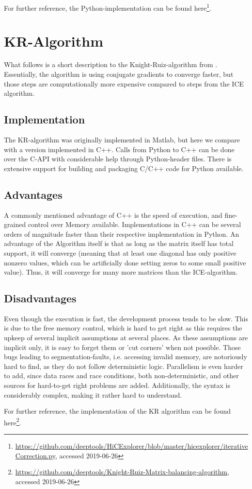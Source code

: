 For further reference, the Python-implementation can be found
here\footnote{\url{https://github.com/deeptools/HiCExplorer/blob/master/hicexplorer/iterativeCorrection.py},
accessed 2019-06-26}.



\section{KR-Algorithm}\label{sec:KR}

What follows is a short description to the Knight-Ruiz-algorithm from
\cite{knight2013fast}. Essentially, the algorithm is using conjugate gradients
to converge faster, but those steps are computationally more expensive
compared to steps from the ICE algorithm.

\subsection{Implementation}

The KR-algorithm was originally implemented in Matlab, but here we compare with
a version implemented in C++. Calls from Python to C++ can be done over the
C-API with considerable help through Python-header files. There is extensive
support for building and packaging C/C++ code for Python available.

\subsection{Advantages}

A commonly mentioned advantage of C++ is the speed of execution, and
fine-grained control over Memory available. Implementations in C++ can be
several orders of magnitude faster than their respective implementation in
Python. An advantage of the Algorithm itself is that as long as the matrix
itself has total support, it will converge (meaning that at least one diagonal
has only positive nonzero values, which can be artificially done setting zeros
to some small positive value). Thus, it will converge for many more matrices
than the ICE-algorithm.

\subsection{Disadvantages}

Even though the execution is fast, the development process tends to be slow.
This is due to the free memory control, which is hard to get right as this
requires the upkeep of several implicit assumptions at several places. As these
assumptions are implicit only, it is easy to forget them or 'cut corners' when
not possible. Those bugs leading to segmentation-faults, i.e. accessing invalid
memory, are notoriously hard to find, as they do not follow deterministic logic.
Parallelism is even harder to add, since data races and race conditions, both
non-deterministic, and other sources for hard-to-get right problems are added.
Additionally, the syntax is considerably complex, making it rather hard to
understand.

For further reference, the implementation of the KR algorithm can be found
here\footnote{\url{https://github.com/deeptools/Knight-Ruiz-Matrix-balancing-algorithm},
\\ accessed 2019-06-26}.




